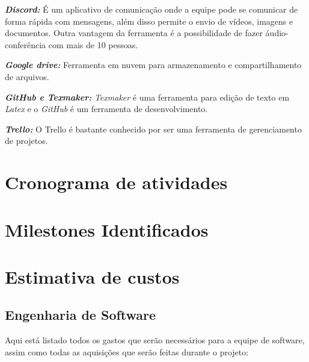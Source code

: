 \emph{\textbf{Discord:}} É um aplicativo de comunicação onde a equipe pode se comunicar de forma rápida com mensagens, além disso permite o envio de vídeos, imagens e documentos. Outra vantagem da ferramenta é a possibilidade de fazer áudio-conferência com mais de 10 pessoas.

\emph{\textbf{Google drive:}} Ferramenta em nuvem para armazenamento e compartilhamento de arquivos.

\emph{\textbf{GitHub e Texmaker:}} \emph{Texmaker} é uma ferramenta para edição de texto em \emph{Latex} e o \emph{GitHub} é um ferramenta de desenvolvimento.

\emph{\textbf{Trello:}} O Trello é bastante conhecido por ser uma ferramenta de gerenciamento de projetos. 

\section{Cronograma de atividades}
\section{Milestones Identificados}
\section{Estimativa de custos}

\subsection{Engenharia de Software}

Aqui está listado todos os gastos que serão necessários para a equipe de software, assim como todas as aquisições que serão feitas durante o projeto:

\begin{table}[h]
\end{table}

